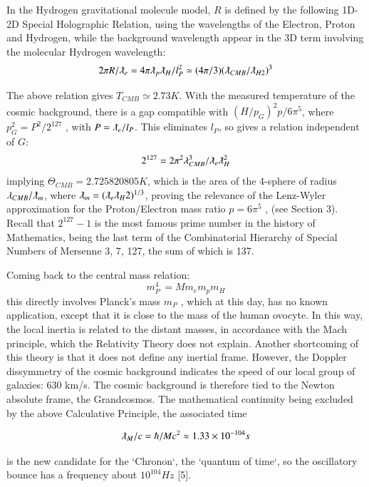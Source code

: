 \documentclass[twoside,draft]{article}
\begin{document}
\begin{sloppypar}
{In the Hydrogen gravitational molecule model, $R$ is defined by the following 1D-2D Special
Holographic Relation, using the wavelengths of the Electron, Proton and Hydrogen, while the background wavelength appear in the 3D term involving the molecular Hydrogen wavelength:
\begin{equation}
2 \pi R/\lambdabar_{e} = 4 \pi \lambdabar_{p} \lambdabar_{H} /l_{P}^2 \simeq (4\pi/3)(\lambdabar_{CMB} /\lambdabar_{H2})^{3}
\end{equation}

The above relation gives $T_{CMB} \simeq 2.73 K$. With the measured temperature of the cosmic
background, there is a gap compatible with $(H/p_G)^2 p/6\pi^5 $, where $p_{G}^{2} = P^{2} /2^{127}$ , with $P = \lambdabar_{e} /l_{P}$. 
This eliminates $l_{P}$, so gives a relation independent of $G$:
$$2^{127} = 2\pi^{2} \lambda_{CMB}^{3} /\lambdabar_{e} \lambdabar_{H}^2$$
implying $\Theta_{CMB} = 2.725820805 K$, which is the area of the 4-sphere of radius $\lambda_{CMB} / \lambdabar_{m}$, where $\lambdabar_{m} = (\lambdabar_{e} \lambdabar_{H} 2 )^{1/3} $, proving the relevance of
the Lenz-Wyler approximation for the Proton/Electron mass ratio $p = 6\pi^{5}$ , (see Section 3). Recall
that $2^{127} - 1$ is the most famous prime number in the history of Mathematics, being the last term of
the Combinatorial Hierarchy of Special Numbers of Mersenne 3, 7, 127, the sum of which is 137.

Coming back to the central mass relation:
\begin{equation}
m_{P}^{4}\, = M m_{e} m_{p} m_{H}
\end{equation}
this directly involves Planck's mass $m_{P}$ , which at this day, has no known application, except
that it is close to the mass of the human ovocyte. In this way, the local inertia is related to the distant
masses, in accordance with the Mach principle, which the Relativity Theory does not explain.
Another shortcoming of this theory is that it does not define any inertial frame. However, the
Doppler dissymmetry of the cosmic background indicates the speed of our local group of galaxies:
630 km/s. The cosmic background is therefore tied to the Newton absolute frame, the Grandcosmos.
The mathematical continuity being excluded by the above Calculative Principle, the associated
time 

$$\lambdabar_{M} /c = \hbar/Mc^2 \approx 1.33 \times 10^{-104}s$$

is the new candidate for the `Chronon`, the `quantum of time`, so the
oscillatory bounce has a frequency about $10^{104}Hz$ [5].

}
\end{sloppypar}
\end{document}
